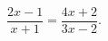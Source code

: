 \begin{ex}[type=equation]
	\begin{condition}
		$\dfrac{2x - 1}{x + 1} = \dfrac{4x + 2}{3x - 2}.$
	\end{condition}
\end{ex}